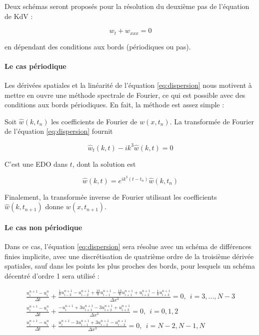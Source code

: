 \indent Deux schémas seront proposés pour la résolution du deuxième pas de l'équation de KdV :

\begin{equation}
	\label{eq:dispersion}
	w_t + w_{xxx} = 0
\end{equation}

\noindent en dépendant des conditions aux bords (périodiques ou pas).

\paragraph{Le cas périodique}

\indent Les dérivées spatiales et la linéarité de l'équation \eqref{eq:dispersion} nous motivent à mettre en ouvre une méthode spectrale de Fourier, ce qui est possible avec des conditions aux bords périodiques. En fait, la méthode est assez simple :

\indent Soit $\hat{w}(k,t_n)$  les coefficients de Fourier de $w(x,t_n)$. La transformée de Fourier de l'équation \eqref{eq:dispersion} fournit

\begin{equation*}
	\hat{w}_t(k,t) - ik^3\hat{w}(k,t) = 0
\end{equation*}

\indent C'est une EDO dans $t$, dont la solution est

\begin{equation*}
\hat{w}(k,t) = e^{ik^3(t-t_n)}\hat{w}(k,t_n)
\end{equation*}

\indent Finalement, la transformée inverse de Fourier utilisant les coefficients $\hat{w}(k,t_{n+1})$ donne $w(x,t_{n+1})$.

\paragraph{Le cas non périodique}

\indent Dans ce cas, l'équation \eqref{eq:dispersion} sera résolue avec un schéma de différences finies implicite, avec une discrétisation de quatrième ordre de la troisième dérivée spatiales, sauf dans les points les plus proches des bords, pour lesquels un schéma décentré  d'ordre 1 sera utilisé :

\begin{equation*}
\begin{gathered}
	\frac{u_i^{n+1} - u_i^n}{\Delta t} + \frac{\frac{1}{8}u_{i-3}^{n+1} - u_{i-2}^{n+1}  + \frac{13}{8}u_{i-1}^{n+1} - \frac{13}{8}u_{i+1}^{n+1} + u_{i+2}^{n+1} - \frac{1}{8}u_{i+3}^{n+1}}{\Delta x^3} = 0, \ \ i = 3,...,N-3 \\
	\frac{u_i^{n+1} - u_i^n}{\Delta t}  + \frac{-u_{i}^{n+1} + 3u_{i+1}^{n+1}  -3 u_{i+2}^{n+1} + u_{i+3}^{n+1} }{\Delta x^3} = 0, \ \ i = 0,1,2 \\
	\frac{u_i^{n+1} - u_i^n}{\Delta t}  + \frac{u_{i}^{n+1} - 3u_{i-1}^{n+1}  + 3 u_{i-2}^{n+1} - u_{i-3}^{n+1} }{\Delta x^3} = 0, \ \ i = N-2,N-1,N 
\end{gathered} 
\end{equation*}

